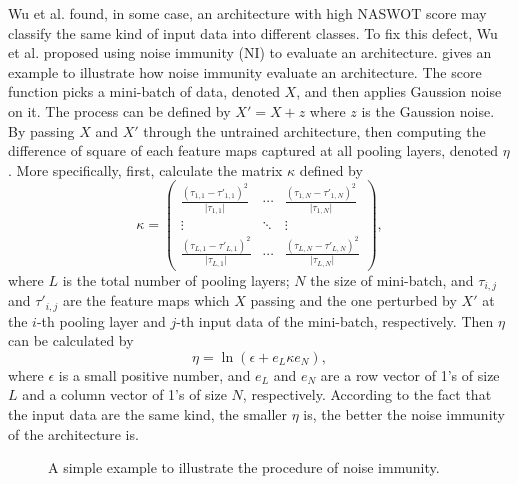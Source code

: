 \documentclass[sigconf]{acmart}
\begin{document}
    Wu et al. \cite{10092788} found, in some case, an architecture with high 
    NASWOT score may classify the same kind of input data into different classes. 
    To fix this defect, Wu et al. proposed using noise immunity (NI) to 
    evaluate an architecture.  gives an example to illustrate how 
    noise immunity evaluate an architecture. The score function picks a 
    mini-batch of data, denoted $X$, and then applies Gaussion noise on it. 
    The process can be defined by $X'=X+z$ where $z$ is the Gaussion noise. 
    By passing $X$ and $X'$ through the untrained architecture, then computing 
    the difference of square of each feature maps captured at all pooling layers, 
    denoted $\eta$. More specifically, first, calculate the matrix $\kappa$ defined by 
    \begin{equation}
        \label{equ:ni_kappa}
        \kappa=\begin{pmatrix}\frac{(\tau_{1,1}-\tau'_{1,1})^2}{\lvert \tau_{1,1}\rvert}&\cdots&\frac{(\tau_{1,N}-\tau'_{1,N})^2}{\lvert \tau_{1,N}\rvert}\\\vdots&\ddots&\vdots\\\frac{(\tau_{L,1}-\tau'_{L,1})^2}{\lvert \tau_{L,1}\rvert}&\cdots&\frac{(\tau_{L,N}-\tau'_{L,N})^2}{\lvert \tau_{L,N}\rvert}\end{pmatrix},
    \end{equation}
    where $L$ is the total number of pooling layers; $N$ the size of mini-batch, 
    and $\tau_{i,j}$ and $\tau'_{i,j}$ are the feature maps which $X$ passing and 
    the one perturbed by $X'$ at the $i$-th pooling layer and $j$-th input 
    data of the mini-batch, respectively. 
    Then $\eta$ can be calculated by 
    \begin{equation}
        \label{equ:ni_eta}
        \eta=\ln(\epsilon+e_L\kappa e_N),
    \end{equation}
    where $\epsilon$ is a small positive number, and $e_L$ and $e_N$ are a row 
    vector of 1's of size $L$ and a column vector of 1's of size $N$, respectively. 
    According to the fact that the input data are the same kind, the smaller $\eta$ 
    is, the better the noise immunity of the architecture is.

    \begin{figure*}[tb]
        \vspace{-\baselineskip}
        \caption{A simple example to illustrate the procedure of noise immunity.}
        \label{fig:ni}
        \centering
        \vspace{-\baselineskip}
    \end{figure*}
\end{document}
